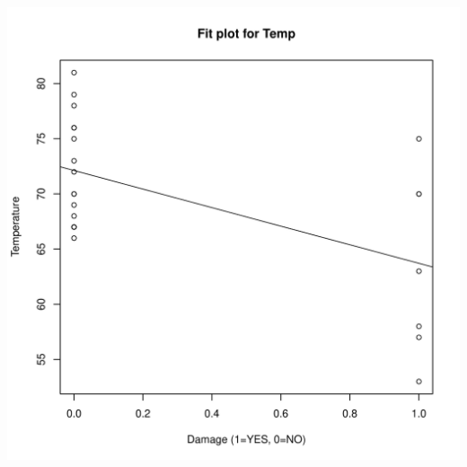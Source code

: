 \documentclass{article}\usepackage[]{graphicx}\usepackage[]{color}
\makeatletter
\def\maxwidth{ %
  \ifdim\Gin@nat@width>\linewidth
    \linewidth
  \else
    \Gin@nat@width
  \fi
}
\newenvironment{knitrout}{}{} %
\makeatother
\begin{document}
\begin{knitrout}
\includegraphics[width=\maxwidth]{figure/unnamed-chunk-10-1} 

\end{knitrout}
\end{document}
